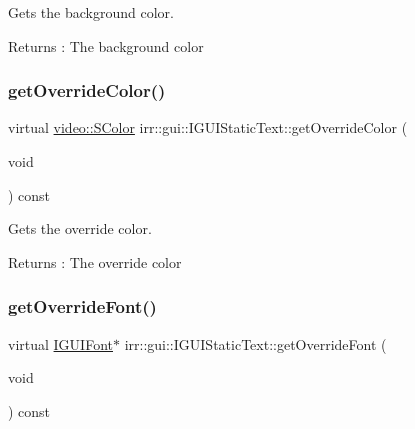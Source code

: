 Gets the background color. 

\begin{DoxyReturn}{Returns}
\+: The background color 
\end{DoxyReturn}
\mbox{\label{classirr_1_1gui_1_1IGUIStaticText_a9c4c43f262efd02a113da79bedb973e1}} 
\subsubsection{\texorpdfstring{get\+Override\+Color()}{getOverrideColor()}}
{\footnotesize\ttfamily virtual \hyperlink{classirr_1_1video_1_1SColor}{video\+::\+S\+Color} irr\+::gui\+::\+I\+G\+U\+I\+Static\+Text\+::get\+Override\+Color (\begin{DoxyParamCaption}\item[{void}]{ }\end{DoxyParamCaption}) const\hspace{0.3cm}{\ttfamily [pure virtual]}}



Gets the override color. 

\begin{DoxyReturn}{Returns}
\+: The override color 
\end{DoxyReturn}
\mbox{\label{classirr_1_1gui_1_1IGUIStaticText_a581f18f3ffe650246125988b3b7dc44e}} 
\subsubsection{\texorpdfstring{get\+Override\+Font()}{getOverrideFont()}}
{\footnotesize\ttfamily virtual \hyperlink{classirr_1_1gui_1_1IGUIFont}{I\+G\+U\+I\+Font}$\ast$ irr\+::gui\+::\+I\+G\+U\+I\+Static\+Text\+::get\+Override\+Font (\begin{DoxyParamCaption}\item[{void}]{ }\end{DoxyParamCaption}) const\hspace{0.3cm}{\ttfamily [pure virtual]}}



